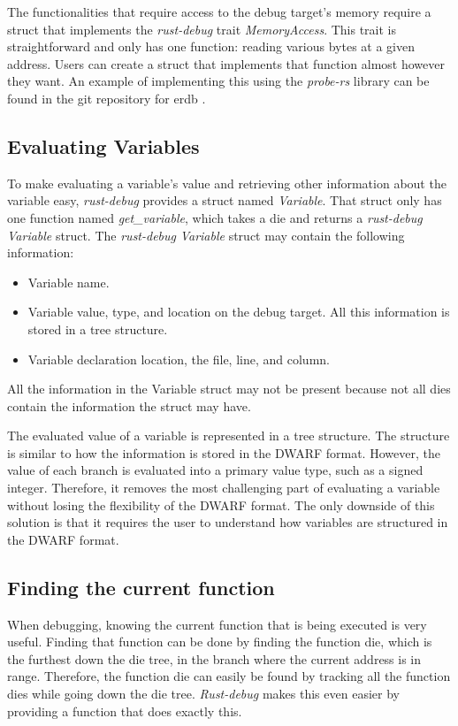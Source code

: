 The functionalities that require access to the debug target's memory require a struct that implements the \emph{rust-debug} trait \emph{MemoryAccess}.
This trait is straightforward and only has one function: reading various bytes at a given address.
Users can create a struct that implements that function almost however they want.
An example of implementing this using the \emph{probe-rs} library can be found in the git repository for \gls{erdb} \cite{erdb}.



\subsection{Evaluating Variables} \label{sec:ievalvar}
To make evaluating a variable's value and retrieving other information about the variable easy, \emph{rust-debug} provides a struct named \emph{Variable}.
That struct only has one function named \emph{get\_variable}, which takes a \gls{die} and returns a \emph{rust-debug} \emph{Variable} struct.
The \emph{rust-debug} \emph{Variable} struct may contain the following information:


\begin{itemize}
  \item Variable name.
  \item Variable value, type, and location on the debug target. All this information is stored in a tree structure.
  \item Variable declaration location, the file, line, and column.
\end{itemize}


All the information in the Variable struct may not be present because not all \glspl{die} contain the information the struct may have.


The evaluated value of a variable is represented in a tree structure.
The structure is similar to how the information is stored in the \gls{DWARF} format.
However, the value of each branch is evaluated into a primary value type, such as a signed integer.
Therefore, it removes the most challenging part of evaluating a variable without losing the flexibility of the \gls{DWARF} format.
The only downside of this solution is that it requires the user to understand how variables are structured in the \gls{DWARF} format.


\subsection{Finding the current function} \label{sec:funcdie}
When debugging, knowing the current function that is being executed is very useful.
Finding that function can be done by finding the function \gls{die}, which is the furthest down the \gls{die} tree, in the branch where the current address is in range.
Therefore, the function \gls{die} can easily be found by tracking all the function \glspl{die} while going down the \gls{die} tree.
\emph{Rust-debug} makes this even easier by providing a function that does exactly this.



